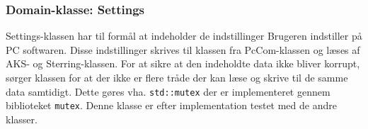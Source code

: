 \subsubsection{Domain-klasse: Settings} \label{sec:settings}
Settings-klassen har til formål at indeholder de indstillinger Brugeren indstiller på PC softwaren. Disse indstillinger skrives til klassen fra PcCom-klassen og læses af AKS- og Sterring-klassen. For at sikre at den indeholdte data ikke bliver korrupt, sørger klassen for at der ikke er flere tråde der kan læse og skrive til de samme data samtidigt. Dette gøres vha. \texttt{std::mutex} der er implementeret gennem biblioteket \texttt{mutex}. Denne klasse er efter implementation testet med de andre klasser.
